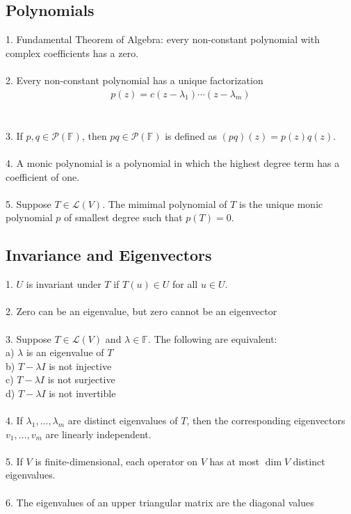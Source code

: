 \documentclass[11pt,reqno]{article}
\newcommand{\F}{\mathbb{F}}
\theoremstyle{definition}
\begin{document}
\subsection*{Polynomials}
1. Fundamental Theorem of Algebra: every non-constant polynomial with complex coefficients has a zero.\\\\
2. Every non-constant polynomial has a unique factorization
\begin{align*}
    p(z) = c(z - \lambda_1)\cdots(z - \lambda_m)
\end{align*}\\\\
3. If $p,q\in\mathcal{P}(\F)$, then $pq\in\mathcal{P}(\F)$ is defined as $(pq)(z) = p(z)q(z)$.\\\\
4. A monic polynomial is a polynomial in which the highest degree term has a coefficient of one.\\\\
5. Suppose $T\in\mathcal{L}(V)$. The mimimal polynomial of $T$ is the unique monic polynomial $p$ of smallest degree such that $p(T) = 0$.

\subsection*{Invariance and Eigenvectors}
1. $U$ is invariant under $T$ if $T(u)\in U$ for all $u\in U$.\\\\
2. Zero can be an eigenvalue, but zero cannot be an eigenvector\\\\
3. Suppose $T\in\mathcal{L}(V)$ and $\lambda\in\F$. The following are equivalent:\\
\indent a) $\lambda$ is an eigenvalue of $T$\\
\indent b) $T - \lambda I$ is not injective\\
\indent c) $T - \lambda I$ is not surjective\\
\indent d) $T - \lambda I$ is not invertible\\\\
4. If $\lambda_1,\ldots,\lambda_m$ are distinct eigenvalues of $T$, then the corresponding eigenvectors $v_1,\ldots,v_m$ are linearly independent.\\\\
5. If $V$ is finite-dimensional, each operator on $V$ has at most $\dim V$ distinct eigenvalues.\\\\
6. The eigenvalues of an upper triangular matrix are the diagonal values
\end{document}
